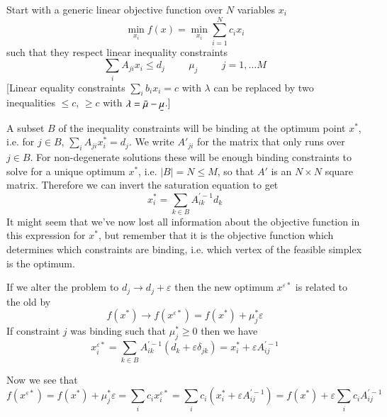\documentclass[final,3p,times]{elsarticle}
\newcommand{\ubar}[1]{\text{\b{$#1$}}}
\def\m{\mu}
\begin{document}
Start with a generic linear objective function over $N$ variables $x_i$
\begin{equation}
 \min_{x_i} f(x) =  \min_{x_i}  \sum_{i=1}^N c_i x_i
\end{equation}
such that they respect linear inequality constraints
\begin{equation}
  \sum_i A_{ji} x_i \leq d_j \hspace{1cm} \m_j \hspace{1cm} j=1,\dots M
\end{equation}
    [Linear equality constraints $\sum_i b_i x_i = c$ with $\lambda$ can be replaced by two inequalities $\leq c$, $\geq c$ with $\lambda = \bar{\m} - \ubar{\m}$.]

A subset $B$ of the inequality constraints will be binding at the
optimum point $x^*$, i.e. for $j\in B$, $\sum_i A_{ji} x^*_i = d_j$. We
write $A'_{ji}$ for the matrix that only runs over $j\in B$. For
non-degenerate solutions these will be enough binding constraints to
solve for a unique optimum $x^*$, i.e. $|B| = N \leq M$, so that $A'$ is an $N\times N$
square matrix.  Therefore we can invert the saturation equation to get
\begin{equation}
  x^*_i = \sum_{k\in B} A^{\prime -1}_{ik} d_k
\end{equation}
It might seem that we've now lost all information about the objective function in this expression for $x^*$, but remember that it is the objective function which determines which constraints are binding, i.e. which vertex of the feasible simplex is the optimum.


If we alter the problem to $d_j \to d_j + \varepsilon$ then the new optimum $x^{\varepsilon*}$ is related to the old by
\begin{equation}
  f(x^*) \to f(x^{\varepsilon*}) = f(x^*) + \mu_j^* \varepsilon
\end{equation}
If constraint $j$ was binding such that $\mu_j^* \geq 0$ then we have
\begin{equation}
  x^{\varepsilon*}_i = \sum_{k\in B} A^{\prime -1}_{ik} \left(d_k + \varepsilon \delta_{jk}\right) = x^*_i + \varepsilon A^{\prime -1}_{ij}
\end{equation}

Now we see that
\begin{equation}
  f(x^{\varepsilon*}) = f(x^*) + \mu_j^* \varepsilon = \sum_i c_i  x^{\varepsilon*}_i = \sum_i c_i \left(x^*_i + \varepsilon A^{\prime -1}_{ij}\right) = f(x^*) +   \varepsilon \sum_i c_i  A^{\prime -1}_{ij}
\end{equation}
\end{document}
